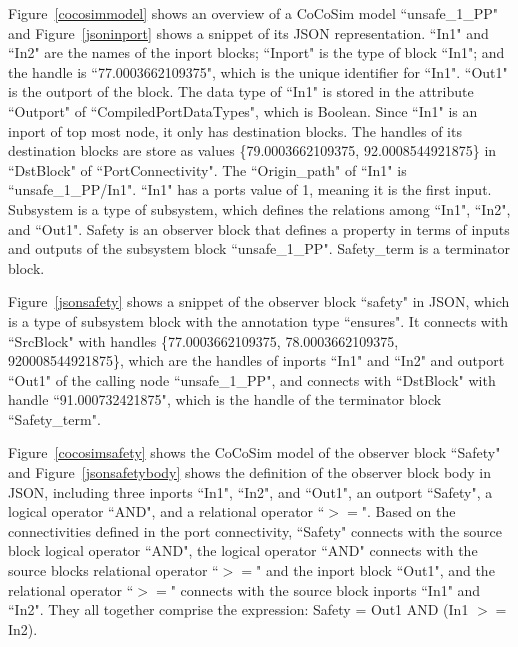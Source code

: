 \documentclass{article}
\begin{document}
Figure~\ref{cocosimmodel} shows an overview of a CoCoSim model ``unsafe\_1\_PP" and Figure~\ref{jsoninport} shows a snippet of its JSON representation. 
\textsf{``In1"} and \textsf{``In2"} are the names of the inport blocks; \textsf{``Inport"} is the type of block \textsf{``In1"}; and the handle is \textsf{``77.0003662109375"}, which is the unique identifier for \textsf{``In1"}. 
\textsf{``Out1"} is the outport of the block.
The data type of \textsf{``In1"} is stored in the attribute \textsf{``Outport"} of \textsf{``CompiledPortDataTypes"}, which is Boolean. 
Since \textsf{``In1"} is an inport of top most node, it only has destination blocks. 
The handles of its destination blocks are store as values \textsf{\{79.0003662109375, 92.0008544921875\}} in \textsf{``DstBlock"} of \textsf{``PortConnectivity"}. 
The \textsf{``Origin\_path"} of \textsf{``In1"} is \textsf{``unsafe\_1\_PP/In1"}.
\textsf{``In1"} has a ports value of 1, meaning it is the first input. 
Subsystem is a type of \textsf{subsystem}, which defines the relations among \textsf{``In1", ``In2"}, and \textsf{``Out1"}. 
Safety is an observer block that defines a property in terms of inputs and outputs of the subsystem block ``unsafe\_1\_PP". 
Safety\_term is a terminator block.

Figure~\ref{jsonsafety} shows a snippet of the observer block ``safety" in JSON, which is a type of subsystem block with the annotation type \textsf{``ensures"}.
It connects with \textsf{``SrcBlock"} with handles\textsf{ \{77.0003662109375, 78.0003662109375, 920008544921875\}}, which are the handles of inports \textsf{``In1"} and \textsf{``In2"} and outport \textsf{``Out1"} of the calling node \textsf{``unsafe\_1\_PP"},  and connects with \textsf{``DstBlock"} with handle \textsf{``91.000732421875"}, which is the handle of the terminator block \textsf{``Safety\_term"}. 

Figure~\ref{cocosimsafety} shows the CoCoSim model of the observer block \textsf{``Safety"} and Figure~\ref{jsonsafetybody} shows the definition of the observer block body in JSON, including 
three inports \textsf{``In1", ``In2"}, and \textsf{``Out1"}, an outport \textsf{``Safety"}, a logical operator \textsf{``AND"}, and a relational operator \textsf{``$>=$"}. 
Based on the connectivities defined in the port connectivity, \textsf{``Safety"} connects with the source block logical operator \textsf{``AND"}, the logical operator \textsf{``AND"} connects with the source blocks relational operator \textsf{``$>=$"} and the inport block \textsf{``Out1"}, and the relational operator \textsf{``$>=$"} connects
with the source block inports \textsf{``In1"} and \textsf{``In2"}. 
They all together comprise the expression: \textsf{Safety = Out1 AND (In1 $>=$ In2)}.
\end{document}
